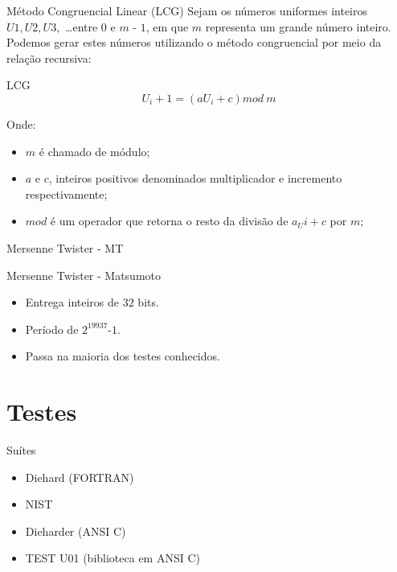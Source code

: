 \documentclass[xcolor=dvipsnames]{beamer}
\begin{document}
\begin{frame}{Método Congruencial Linear (LCG)}
Sejam os números uniformes inteiros $U1, U2, U3,$ \dots  entre $0$ e $m$ - $1$, em que $m$ representa um grande número inteiro.
Podemos gerar estes números utilizando o método congruencial por meio da relação recursiva:
 \pause
 \begin{block}{LCG}
  \begin{equation*}
    U_i+1 = (aU_i + c) mod \ m
  \end{equation*}
 \end{block}
 \pause
 \begin{block}{Onde:}
  \begin{itemize}
   \item $m$ é chamado de módulo;
   \item $a$ e $c$, inteiros positivos denominados multiplicador e incremento respectivamente;
   \item $mod$ é um operador que retorna o resto da divisão de $a_Ui + c$ por $m$;
  \end{itemize}
 \end{block}
\end{frame}

\begin{frame}{Mersenne Twister - MT}
  \begin{block}{Mersenne Twister - Matsumoto \cite{Matsumoto:MT}}
    \begin{itemize}
      \item Entrega inteiros de $32$ bits.
      \pause
      \item Período de $2^{19937}$-$1$.
      \pause
      \item Passa na maioria dos testes conhecidos.
      \end{itemize}
  \end{block}
\end{frame}


\section{Testes}
\begin{frame}{Suítes}
  \begin{itemize}
   \item Diehard (FORTRAN) \cite{Marsaglia:14}
   \pause
   \item NIST \cite{NIST:99}
   \pause
   \item Dieharder (ANSI C) \cite{Brown:04}
   \pause
   \item TEST U01 (biblioteca em ANSI C) \cite{LEcuyer:07}
  \end{itemize}

\end{frame}
\end{document}
